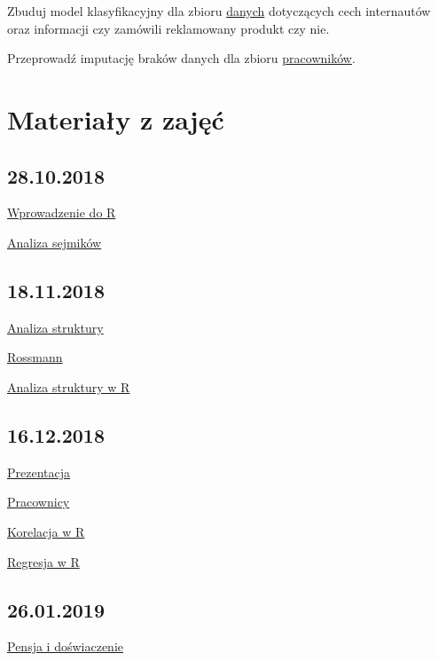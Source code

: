 \documentclass[]{book}
\begin{document}
Zbuduj model klasyfikacyjny dla zbioru \href{data/Social_Network_Ads.csv}{danych} dotyczących cech internautów oraz informacji czy zamówili reklamowany produkt czy nie.

Przeprowadź imputację braków danych dla zbioru \href{data/pracownicy.RData}{pracowników}.

\hypertarget{materiay-z-zajec}{%
\chapter{Materiały z zajęć}\label{materiay-z-zajec}}

\hypertarget{section}{%
\section{28.10.2018}\label{section}}

\href{res/skrypt20181028.R}{Wprowadzenie do R}

\href{res/analiza20181028.R}{Analiza sejmików}

\hypertarget{section-1}{%
\section{18.11.2018}\label{section-1}}

\href{https://departmentofstatisticspue.github.io/statystyka-opisowa/analiza-struktury.html}{Analiza struktury}

\href{data/rossmann.xlsx}{Rossmann}

\href{res/zajecia20181118.R}{Analiza struktury w R}

\hypertarget{section-2}{%
\section{16.12.2018}\label{section-2}}

\href{prezentacje/03.html}{Prezentacja}

\href{data/Salary_Data.csv}{Pracownicy}

\href{res/korelacje20181216.R}{Korelacja w R}

\href{res/regresja20181216.Rmd}{Regresja w R}

\hypertarget{section-3}{%
\section{26.01.2019}\label{section-3}}

\href{data/salary.xlsx}{Pensja i doświaczenie}
\end{document}
